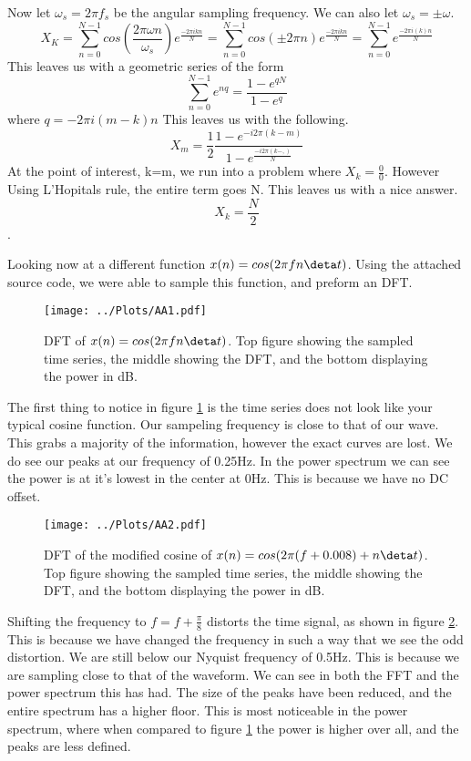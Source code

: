 \documentclass[twocolumn]{myarticle}
\begin{document}
Now let $\omega_{s}=2\pi f_{s}$ be the angular sampling frequency. We can also let $\omega_{s} = \pm \omega$.
\begin{equation*}
X_{K}=\sum^{N-1}_{n=0}cos(\frac{2\pi \omega n}{\omega_{s}})e^{\frac{-2\pi ikn}{N}}=\sum^{N-1}_{n=0}cos(\pm 2\pi n)e^{\frac{-2\pi ikn}{N}} = \sum^{N-1}_{n=0}e^{\frac{-2\pi i(k)n}{N}}
\end{equation*}
This leaves us with a geometric series of the form 
\begin{equation*}
\sum_{n=0}^{N-1}e^{nq} = \frac{1-e^{qN}}{1-e^{q}}
\end{equation*}
where $q=-2\pi i(m-k)n$ This leaves us with the following.
\begin{equation*}
X_{m} = \frac{1}{2} \frac{1-e^{-i2\pi (k-m)}}{1-e^{\frac{-i2\pi (k-,)}{N}}}
\end{equation*}
At the point of interest, k=m, we run into a problem where $X_{k}=\frac{0}{0}$. However Using L'Hopitals rule, the entire term goes N. This leaves us with a nice answer.
\begin{equation*}
X_{k}=\frac{N}{2}
\end{equation*}.

Looking now at a different function $x(n)=cos(2\pi fn\deta t)$. Using the attached source code, we were able to sample this function, and preform an DFT.

\begin{figure*}[htpb]
    \centering
    \texttt{[image: ../Plots/AA1.pdf]}
    \caption{%
        DFT of $x(n)=cos(2\pi fn\deta t)$. Top figure showing the sampled time series, the middle showing the DFT, and the bottom displaying the power in dB.
    }
    \label{fig:AA1}
\end{figure*}

The first thing to notice in figure \ref{fig:AA1} is the time series does not look like your typical cosine function. Our sampeling frequency is close to that of our wave. This grabs a majority of the information, however the exact curves are lost. We do see our peaks at our frequency of 0.25Hz. In the power spectrum we can see the power is at it's lowest in the center at 0Hz. This is because we have no DC offset. 

\begin{figure*}[htpb]
    \centering
    \texttt{[image: ../Plots/AA2.pdf]}
    \caption{%
        DFT of the modified cosine of $x(n)=cos(2\pi (f+0.008) + n\deta t)$. Top figure showing the sampled time series, the middle showing the DFT, and the bottom displaying the power in dB.
    }
    \label{fig:AA2}
\end{figure*}
Shifting the frequency to $f=f+\frac{\pi}{8}$ distorts the time signal, as shown in figure \ref{fig:AA2}. This is because we have changed the frequency in such a way that we see the odd distortion. We are still below our Nyquist frequency of 0.5Hz. This is because we are sampling close to that of the waveform. We can see in both the FFT and the power spectrum this has had. The size of the peaks have been reduced, and the entire spectrum has a higher floor. This is most noticeable in the power spectrum, where when compared to figure \ref{fig:AA1} the power is higher over all, and the peaks are less defined.   
\end{document}
